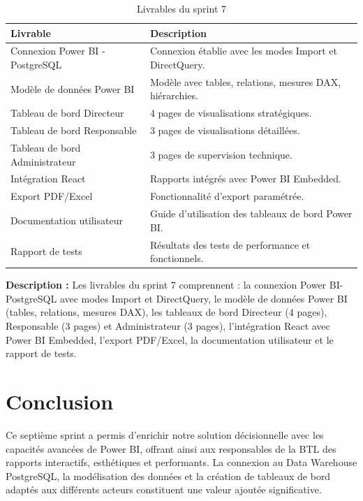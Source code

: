 \begin{table}[H]
\centering
\begin{tabular}{|p{4cm}|p{9cm}|}
\hline
\textbf{Livrable} & \textbf{Description} \\
\hline
Connexion Power BI - PostgreSQL & Connexion établie avec les modes Import et DirectQuery. \\
\hline
Modèle de données Power BI & Modèle avec tables, relations, mesures DAX, hiérarchies. \\
\hline
Tableau de bord Directeur & 4 pages de visualisations stratégiques. \\
\hline
Tableau de bord Responsable & 3 pages de visualisations détaillées. \\
\hline
Tableau de bord Administrateur & 3 pages de supervision technique. \\
\hline
Intégration React & Rapports intégrés avec Power BI Embedded. \\
\hline
Export PDF/Excel & Fonctionnalité d'export paramétrée. \\
\hline
Documentation utilisateur & Guide d'utilisation des tableaux de bord Power BI. \\
\hline
Rapport de tests & Résultats des tests de performance et fonctionnels. \\
\hline
\end{tabular}
\caption{Livrables du sprint 7}
\label{tab:sprint7-livrables}
\end{table}


\textbf{Description :} Les livrables du sprint 7 comprennent : la connexion Power BI-PostgreSQL avec modes Import et DirectQuery, le modèle de données Power BI (tables, relations, mesures DAX), les tableaux de bord Directeur (4 pages), Responsable (3 pages) et Administrateur (3 pages), l'intégration React avec Power BI Embedded, l'export PDF/Excel, la documentation utilisateur et le rapport de tests.

\section*{Conclusion}

Ce septième sprint a permis d'enrichir notre solution décisionnelle avec les capacités avancées de Power BI, offrant ainsi aux responsables de la BTL des rapports interactifs, esthétiques et performants. La connexion au Data Warehouse PostgreSQL, la modélisation des données et la création de tableaux de bord adaptés aux différents acteurs constituent une valeur ajoutée significative.


